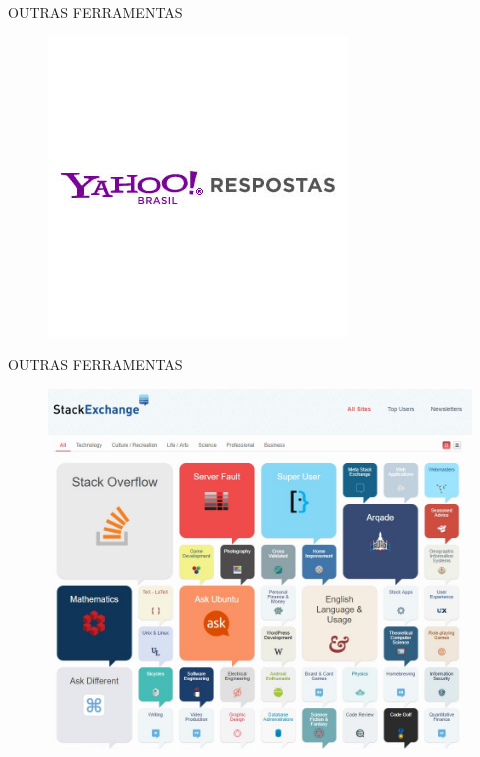 \documentclass{Alexandre}
\begin{document}
\begin{frame}{OUTRAS FERRAMENTAS}

    \begin{figure}
        \includegraphics[scale = 0.65]{Figuras/YahooRespostas.jpg}
    \end{figure}

\end{frame}


\begin{frame}{OUTRAS FERRAMENTAS}

    \begin{figure}
        \includegraphics[scale = 0.35]{Figuras/Outros.jpg}
    \end{figure}

\end{frame}
\end{document}
